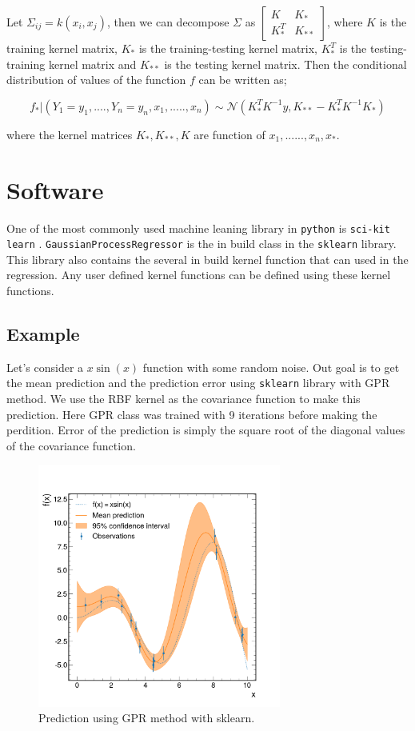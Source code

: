 \documentclass{article}
\begin{document}
Let $\Sigma_{ij} = k(x_{i}, x_{j})$, then we can decompose $\Sigma$ as $\begin{bmatrix}
K & K_{*} \\
K_{*}^{T} & K_{**}
\end{bmatrix}$, where $K$ is the training kernel matrix, $K_{*}$ is the training-testing kernel matrix, $K_{*}^{T}$ is the testing-training kernel matrix and $K_{**}$ is the testing kernel matrix. Then the conditional distribution of values of the function $f$ can be written as;

\begin{equation}
f_{*}|(Y_{1} = y_{1},...., Y_{n} = y_{n}, x_{1},.....,x_{n}) \sim \mathcal{N}(K_{*}^{T}K^{-1}y, K_{**} - K_{*}^{T}K^{-1}K_{*})
\end{equation}

where the kernel matrices $K_{*},K_{**},K$ are function of $x_{1},......,x_{n},x_{*}$.

\section{Software}

One of the most commonly used machine leaning library in \verb|python| is \verb|sci-kit learn| \cite{scikit-learn}. \verb|GaussianProcessRegressor| is the in build class in the \verb|sklearn| library. This library also contains the several in build kernel function that can used in the regression. Any user defined kernel functions can be defined using these kernel functions.

\subsection{Example}

Let's consider a $x\sin(x)$ function with some random noise. Out goal is to get the mean prediction and the prediction error using \verb|sklearn| library with GPR method. We use the RBF kernel as the covariance function to make this prediction. Here GPR class was trained with 9 iterations before making the perdition. Error of the prediction is simply the square root of the diagonal values of the covariance function.

\begin{figure}
\centering
\includegraphics[width=8.0cm]{imgs/rbf.png}
\caption{Prediction using GPR method with sklearn.}
\end{figure}
\end{document}
